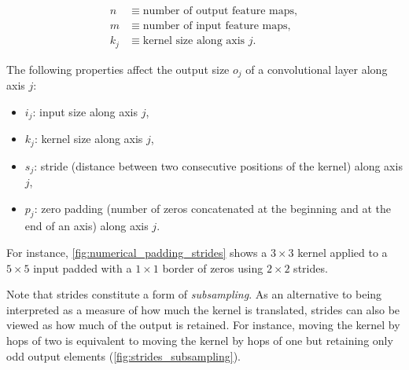 \begin{equation*}
\begin{split}
    n &\equiv \text{number of output feature maps},\\
    m &\equiv \text{number of input feature maps},\\
    k_j &\equiv \text{kernel size along axis $j$}.
\end{split}
\end{equation*}

The following properties affect the output size $o_j$ of a convolutional layer
along axis $j$:

\begin{itemize}
    \item $i_j$: input size along axis $j$,
    \item $k_j$: kernel size along axis $j$,
    \item $s_j$: stride (distance between two consecutive positions of the
        kernel) along axis $j$,
    \item $p_j$: zero padding (number of zeros concatenated at the beginning and
        at the end of an axis) along axis $j$.
\end{itemize}

\noindent For instance, \autoref{fig:numerical_padding_strides} shows a $3
\times 3$ kernel applied to a $5 \times 5$ input padded with a $1 \times 1$
border of zeros using $2 \times 2$ strides.

Note that strides constitute a form of \emph{subsampling}. As an alternative to
being interpreted as a measure of how much the kernel is translated, strides
can also be viewed as how much of the output is retained. For instance, moving
the kernel by hops of two is equivalent to moving the kernel by hops of one but
retaining only odd output elements (\autoref{fig:strides_subsampling}).

